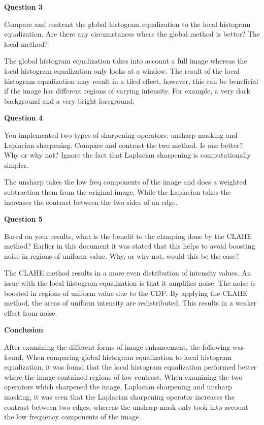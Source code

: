 \documentclass[
]{article}
\begin{document}
\textbf{Question 3}

 Compare and contrast the global histogram equalization to the local histogram equalization. Are there any circumstances where the global method is better? The local method?
 
 The global histogram equalization takes into account a full image whereas the local histogram equalization only looks at a window. The result of the local histogram equalization may result in a tiled effect, however, this can be beneficial if the image has different regions of varying intensity. For example, a very dark background and a very bright foreground.

\textbf{Question 4}

You implemented two types of sharpening operators: unsharp masking and Laplacian sharpening. Compare and contrast the two method. Is one better? Why or why not? Ignore the fact that Laplacian sharpening is computationally simpler.

The unsharp takes the low freq components of the image and does a weighted subtraction them from the original image. While the Laplacian takes the increases the contrast between the two sides of an edge. 

\textbf{Question 5}

Based on your results, what is the benefit to the clamping done by the CLAHE method? Earlier in this document it was stated that this helps to avoid boosting noise in regions of uniform value. Why, or why not, would this be the case?

The CLAHE method results in a more even distribution of intensity values. An issue with the local histogram equalization is that it amplifies noise. The noise is boosted in regions of uniform value due to the CDF. By applying the CLAHE method, the areas of uniform intensity are redistributed. This results in a weaker effect from noise.

\pagebreak

\textbf{Conclusion}

After examining the different forms of image enhancement, the following was found. When comparing global histogram equalization to local histogram equalization, it was found that the local histogram equalization performed better where the image contained regions of low contrast. When examining the two operators which sharpened the image, Laplacian sharpening and unsharp masking, it was seen that the Laplacian sharpening operator increases the contrast between two edges, whereas the unsharp mask only took into account the low frequency components of the image.  
\end{document}
